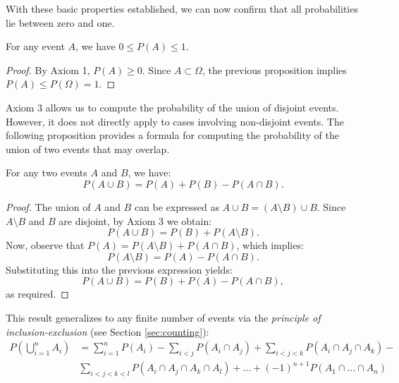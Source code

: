 With these basic properties established, we can now confirm that all probabilities lie between zero and one.

\begin{proposition}
For any event $A$, we have $0 \leq P\left( A \right) \leq 1$.
\end{proposition}
\begin{proof}
By Axiom 1, $P\left( A \right) \geq 0$. Since $A \subset \Omega$, the previous proposition implies $P\left( A \right) \leq P\left( \Omega \right) = 1$.
\end{proof}

Axiom 3 allows us to compute the probability of the union of disjoint events. However, it does not directly apply to cases involving non-disjoint events. The following proposition provides a formula for computing the probability of the union of two events that may overlap.

\begin{proposition}
For any two events $A$ and $B$, we have:
\[
P\left(A \cup B\right) = P\left(A\right) + P\left(B\right) - P\left(A \cap B\right).
\]
\end{proposition}

\begin{proof}
The union of $A$ and $B$ can be expressed as $A \cup B = \left( A \setminus B \right) \cup B$. Since $A \setminus B$ and $B$ are disjoint, by Axiom 3 we obtain:
\[
P\left( A \cup B \right) = P\left( B \right) + P\left( A \setminus B \right).
\]
Now, observe that $P\left( A \right) = P\left( A \setminus B \right) + P\left( A \cap B \right)$, which implies:
\[
P\left( A \setminus B \right) = P\left( A \right) - P\left( A \cap B \right).
\]
Substituting this into the previous expression yields:
\[
P\left( A \cup B \right) = P\left( B \right) + P\left( A \right) - P\left( A \cap B \right),
\]
as required.
\end{proof}

This result generalizes to any finite number of events via the \emph{principle of inclusion-exclusion} (see Section \ref{sec:counting}):
\begin{equation*}
\begin{split}
P \left( \bigcup_{i=1}^n A_i \right) & = \sum_{i=1}^n P \left( A_i \right) - \sum_{i<j} P \left( A_i \cap A_j \right) + \sum_{i<j<k} P \left( A_i \cap A_j \cap A_k \right) - \\
& \sum_{i<j<k<l} P \left( A_i \cap A_j \cap A_k \cap A_l \right) + \ldots +  (-1)^{n+1} P \left( A_1 \cap \ldots \cap A_n \right)
\end{split}
\end{equation*}

